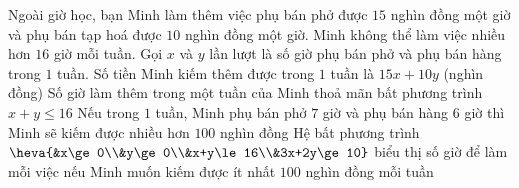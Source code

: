 \begin{ex}%
	Ngoài giờ học, bạn Minh làm thêm việc phụ bán phở được $15$ nghìn đồng một giờ và phụ bán tạp hoá được $10$ nghìn đồng một giờ. Minh không thể làm việc nhiều hơn $16$ giờ mỗi tuần. Gọi $x$ và $y$ lần lượt là số giờ phụ bán phở và phụ bán hàng trong $1$ tuần.
	\choiceTF
	{\True Số tiền Minh kiếm thêm được trong $1$ tuần là $15x+10y$ (nghìn đồng)}
	{\True Số giờ làm thêm trong một tuần của Minh thoả mãn bất phương trình $x+y\le 16$}
	{\True Nếu trong $1$ tuần, Minh phụ bán phở $7$ giờ và phụ bán hàng $6$ giờ thì Minh sẽ kiếm được nhiều hơn $100$ nghìn đồng}
	{Hệ bất phương trình $\heva{&x\ge 0\\&y\ge 0\\&x+y\le 16\\&3x+2y\ge 10}$ biểu thị số giờ để làm mỗi việc nếu Minh muốn kiếm được ít nhất $100$ nghìn đồng mỗi tuần}
\end{ex}
